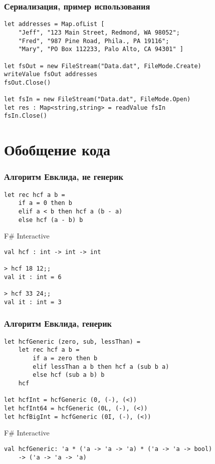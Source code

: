 \documentclass[xetex,mathserif,serif]{beamer}
\begin{document}
	\begin{frame}[fragile]
		\frametitle{Сериализация, пример использования}
		\begin{verbatim}
let addresses = Map.ofList [ 
    "Jeff", "123 Main Street, Redmond, WA 98052";
    "Fred", "987 Pine Road, Phila., PA 19116";
    "Mary", "PO Box 112233, Palo Alto, CA 94301" ]

let fsOut = new FileStream("Data.dat", FileMode.Create)
writeValue fsOut addresses
fsOut.Close()

let fsIn = new FileStream("Data.dat", FileMode.Open)
let res : Map<string,string> = readValue fsIn
fsIn.Close()
		\end{verbatim}
	\end{frame}

	\section{Обобщение кода}

	\begin{frame}[fragile]
		\frametitle{Алгоритм Евклида, не генерик}
		\begin{verbatim}
let rec hcf a b =
    if a = 0 then b
    elif a < b then hcf a (b - a)
    else hcf (a - b) b
		\end{verbatim}

		\begin{alertblock}{F\# Interactive}
			\begin{verbatim}
val hcf : int -> int -> int

> hcf 18 12;;
val it : int = 6

> hcf 33 24;;
val it : int = 3
			\end{verbatim}
		\end{alertblock}
	\end{frame}

	\begin{frame}[fragile]
		\frametitle{Алгоритм Евклида, генерик}
		\begin{verbatim}
let hcfGeneric (zero, sub, lessThan) =
    let rec hcf a b =
        if a = zero then b
        elif lessThan a b then hcf a (sub b a)
        else hcf (sub a b) b
    hcf    
    
let hcfInt = hcfGeneric (0, (-), (<))
let hcfInt64 = hcfGeneric (0L, (-), (<))
let hcfBigInt = hcfGeneric (0I, (-), (<))
		\end{verbatim}

		\begin{alertblock}{F\# Interactive}
			\begin{verbatim}
val hcfGeneric: 'a * ('a -> 'a -> 'a) * ('a -> 'a -> bool) 
    -> ('a -> 'a -> 'a)
			\end{verbatim}
		\end{alertblock}
	\end{frame}
\end{document}
